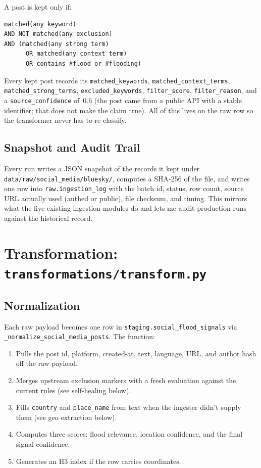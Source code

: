 \documentclass[11pt]{article}
\begin{document}
A post is kept only if:

\begin{lstlisting}
matched(any keyword)
AND NOT matched(any exclusion)
AND (matched(any strong term)
      OR matched(any context term)
      OR contains #flood or #flooding)
\end{lstlisting}

Every kept post records its \texttt{matched\_keywords},
\texttt{matched\_context\_terms}, \texttt{matched\_strong\_terms},
\texttt{excluded\_keywords}, \texttt{filter\_score},
\texttt{filter\_reason}, and a \texttt{source\_confidence} of~0.6 (the
post came from a public API with a stable identifier; that does not
make the claim true). All of this lives on the raw row so the
transformer never has to re-classify.

\subsection{Snapshot and Audit Trail}

Every run writes a JSON snapshot of the records it kept under
\texttt{data/raw/social\_media/bluesky/}, computes a SHA-256 of the
file, and writes one row into \texttt{raw.ingestion\_log} with the batch
id, status, row count, source URL actually used (authed or public),
file checksum, and timing. This mirrors what the five existing
ingestion modules do and lets me audit production runs against the
historical record.

\section{Transformation: \texttt{transformations/transform.py}}

\subsection{Normalization}

Each raw payload becomes one row in \texttt{staging.social\_flood\_signals}
via \texttt{\_normalize\_social\_media\_posts}. The function:

\begin{enumerate}[leftmargin=*]
  \item Pulls the post id, platform, created-at, text, language, URL,
        and author hash off the raw payload.
  \item Merges upstream exclusion markers with a fresh evaluation
        against the current rules (see self-healing below).
  \item Fills \texttt{country} and \texttt{place\_name} from text when
        the ingester didn't supply them (see geo extraction below).
  \item Computes three scores: flood relevance, location confidence,
        and the final signal confidence.
  \item Generates an H3 index if the row carries coordinates.
\end{enumerate}
\end{document}
